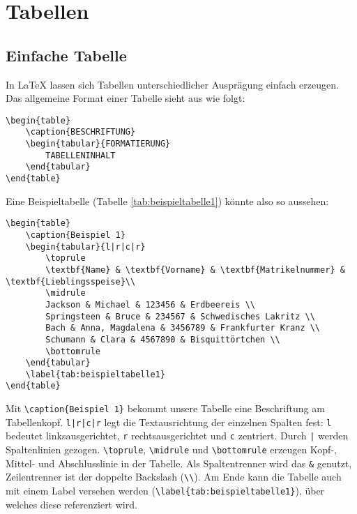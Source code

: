
\chapter{Tabellen}

\section{Einfache Tabelle}
In LaTeX lassen sich Tabellen unterschiedlicher Ausprägung einfach erzeugen. Das allgemeine Format einer Tabelle sieht aus wie folgt:

\begin{lstlisting}[caption={Allgemeines Format}]
\begin{table}
	\caption{BESCHRIFTUNG}
	\begin{tabular}{FORMATIERUNG}
		TABELLENINHALT
	\end{tabular}
\end{table}
\end{lstlisting}

Eine Beispieltabelle (Tabelle \ref{tab:beispieltabelle1}) könnte also so aussehen:

\begin{lstlisting}[caption={Tabelle \ref{tab:beispieltabelle1}}]
\begin{table}
	\caption{Beispiel 1}
	\begin{tabular}{l|r|c|r}
		\toprule
		\textbf{Name} & \textbf{Vorname} & \textbf{Matrikelnummer} & \textbf{Lieblingsspeise}\\
		\midrule
		Jackson & Michael & 123456 & Erdbeereis \\
		Springsteen & Bruce & 234567 & Schwedisches Lakritz \\
		Bach & Anna, Magdalena & 3456789 & Frankfurter Kranz \\
		Schumann & Clara & 4567890 & Bisquittörtchen \\
		\bottomrule
	\end{tabular}
	\label{tab:beispieltabelle1}
\end{table}
\end{lstlisting}

Mit \lstinline|\caption{Beispiel 1}| bekommt unsere Tabelle eine Beschriftung am Tabellenkopf. \lstinline{l|r|c|r} legt die Textausrichtung der einzelnen Spalten fest: \lstinline|l| bedeutet linksausgerichtet, \lstinline|r| rechtsausgerichtet und \lstinline|c| zentriert. Durch \lstinline{|} werden Spaltenlinien gezogen. \lstinline|\toprule|, \lstinline|\midrule| und \lstinline|\bottomrule| erzeugen Kopf-, Mittel- und Abschlusslinie in der Tabelle. Als Spaltentrenner wird das \lstinline{&} genutzt, Zeilentrenner ist der doppelte Backslash (\lstinline|\\|). Am Ende kann die Tabelle auch mit einem Label versehen werden (\lstinline|\label{tab:beispieltabelle1}|), über welches diese referenziert wird.

